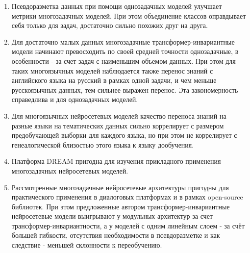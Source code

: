 {}
\begin{enumerate}
  \item {Псевдоразметка данных при помощи однозадачных моделей улучшает метрики многозадачных моделей. При этом объединение классов оправдывает себя только для задач, достаточно сильно похожих друг на друга.}
  \item {Для достаточно малых данных многозадачные трансформер-инвариантные модели начинают превосходить по своей средней точности однозадачные, в особенности - за счет задач с наименьшим объемом данных. При этом для таких многоязычных моделей наблюдается также перенос знаний с английского языка на русский в рамках одной задачи, и чем меньше русскоязычных данных, тем сильнее выражен перенос. Эта закономерность справедлива и для однозадачных моделей.}
  \item {Для многоязычных нейросетевых моделей качество переноса знаний на разные языки на тематических данных сильно коррелирует с размером предобучающей выборки для каждого языка, но при этом не коррелирует с генеалогической близостью этого языка к языку дообучения.}
  \item {Платформа DREAM пригодна для изучения прикладного применения многозадачных нейросетевых моделей.}
  \item {Рассмотренные многозадачные нейросетевые архитектуры пригодны для практического применения в диалоговых платформах и в рамках open-source библиотек. При этом предложенные автором трансформер-инвариантные нейросетевые модели выигрывают у модульных архитектур за счет трансформер-инвариантности, а у моделей с одним линейным слоем - за счёт большей гибкости, отсутствия необходимости в псевдоразметке и как следствие - меньшей склонности к переобучению.}
\end{enumerate}


\iffalse
Направления исследований 1.2.2:
1. Разработка новых математических методов моделирования объектов и
явлений (физико-математические науки).
2. Разработка, обоснование и тестирование эффективных вычислительных
методов с применением современных компьютерных технологий.
3. Реализация эффективных численных методов и алгоритмов в виде
комплексов проблемно-ориентированных программ для проведения
вычислительного эксперимента.
4. Разработка новых математических методов и алгоритмов интерпретации
натурного эксперимента на основе его математической модели.
5. Разработка новых математических методов и алгоритмов валидации
математических моделей объектов на основе данных натурного эксперимента
или на основе анализа математических моделей.
6. Разработка систем компьютерного и имитационного моделирования,
алгоритмов и методов имитационного моделирования на основе анализа
математических моделей (технические науки).
7. Качественные или аналитические методы исследования математических
моделей (технические науки).
8. Комплексные исследования научных и технических проблем с
применением современной технологии математического моделирования и
вычислительного эксперимента.
9. Постановка и проведение численных экспериментов, статистический
анализ их результатов, в том числе с применением современных
компьютерных технологий (технические науки).
\fi


